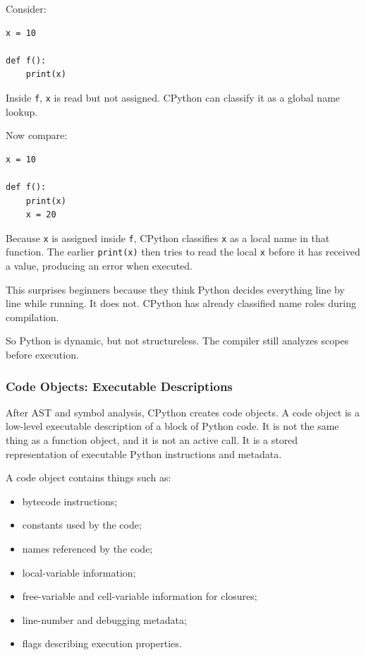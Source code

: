 Consider:

\begin{verbatim}
x = 10

def f():
    print(x)
\end{verbatim}

Inside \texttt{f}, \texttt{x} is read but not assigned. CPython can classify it as a global name lookup.

Now compare:

\begin{verbatim}
x = 10

def f():
    print(x)
    x = 20
\end{verbatim}

Because \texttt{x} is assigned inside \texttt{f}, CPython classifies \texttt{x} as a local name in that function. The earlier \texttt{print(x)} then tries to read the local \texttt{x} before it has received a value, producing an error when executed.

This surprises beginners because they think Python decides everything line by line while running. It does not. CPython has already classified name roles during compilation.

So Python is dynamic, but not structureless. The compiler still analyzes scopes before execution.

\subsubsection{Code Objects: Executable Descriptions}

After AST and symbol analysis, CPython creates code objects. A code object is a low-level executable description of a block of Python code. It is not the same thing as a function object, and it is not an active call. It is a stored representation of executable Python instructions and metadata.

A code object contains things such as:

\begin{itemize}
    \item bytecode instructions;
    \item constants used by the code;
    \item names referenced by the code;
    \item local-variable information;
    \item free-variable and cell-variable information for closures;
    \item line-number and debugging metadata;
    \item flags describing execution properties.
\end{itemize}

